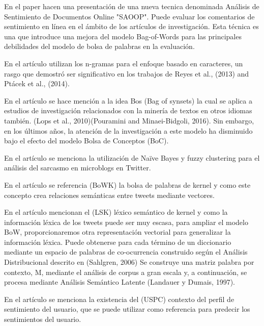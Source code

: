 \documentclass[conference]{IEEEtran}
\begin{document}
En el paper \cite{1} hacen una presentación de una nueva tecnica denominada Análisis de Sentimiento de Documentos Online "SAOOP". 
Puede evaluar los comentarios de sentimiento en línea en el ámbito de los artículos de investigación.
Esta técnica es una que introduce una mejora del modelo Bag-of-Words para las
principales debilidades del modelo de bolsa de palabras en la evaluación.

En el artículo \cite{2}  utilizan los n-gramas para el enfoque basado en caracteres, un rasgo que demostró ser significativo
en los trabajos de Reyes et al., (2013) and Ptácek et al., (2014).

En el artículo \cite{3} se hace mención a la idea Bos (Bag of synsets) la cual se aplica
a estudios de investigación relacionados con la minería de textos en otros idiomas también.
(Lops et al., 2010)(Pouramini and Minaei-Bidgoli, 2016). Sin embargo, en los
últimos años, la atención de la investigación a este modelo ha disminuido bajo el efecto del modelo Bolsa de
Conceptos (BoC).

En el artículo \cite{4} se menciona la utilización de Naïve Bayes y fuzzy clustering para el
análisis del sarcasmo en microblogs en Twitter.

En el artículo \cite{5} se referencia (BoWK) la bolsa de palabras de kernel y como este concepto 
crea relaciones semánticas entre tweets mediante vectores.

 En el artículo \cite{6} mencionan el (LSK) léxico semántico de kernel y como la información
 léxica de los tweets puede ser muy escasa, para ampliar el modelo BoW, proporcionaremos
 otra representación vectorial
 para generalizar la información léxica. Puede obtenerse para cada término de un diccionario mediante un
 espacio de palabras de co-ocurrencia construido según el Análisis Distribucional descrito en (Sahlgren, 2006)
 Se construye una matriz palabra por contexto, M, mediante el análisis de corpus a gran escala y, a continuación, se procesa mediante
 Análisis Semántico Latente (Landauer y Dumais, 1997).  


 En el artículo \cite{7} se menciona la existencia del (USPC) contexto del perfil de sentimiento
 del usuario, que se puede utilizar como referencia para predecir los sentimientos del usuario.
  
\end{document}
